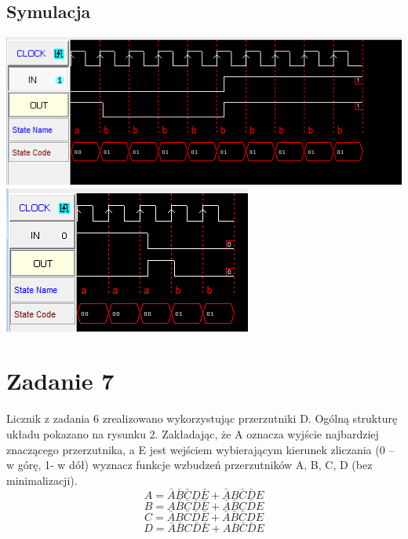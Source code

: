 \documentclass[a4paper, 11pt]{article}
\begin{document}
\subsection{Symulacja}\label{sub:symulacja} %
\begin{center}
	\includegraphics[scale=0.7]{images/4_sym_0.png}
	\includegraphics[scale=0.8]{images/4_sym_1.png}
\end{center}


\section{Zadanie 7}\label{sec:zadanie_} %
Licznik z zadania 6 zrealizowano wykorzystując przerzutniki D. Ogólną strukturę układu pokazano na rysunku 2.
Zakładając, że A oznacza wyjście najbardziej znaczącego przerzutnika, a E jest wejściem
wybierającym kierunek zliczania (0 – w górę, 1- w dół) wyznacz funkcje wzbudzeń przerzutników
A, B, C, D (bez minimalizacji).
\[
	A = \bar{A}\bar{B}\bar{C}D\bar{E} + \bar{A}B\bar{C}\bar{D}E
\]
\[
	B = A\bar{B}\bar{C}\bar{D}\bar{E} + \bar{A}\bar{B}C\bar{D}E
\]
\[
	C = \bar{A}B\bar{C}\bar{D}\bar{E} + \bar{A}\bar{B}\bar{C}DE
\]
\[
    D = \bar{A}\bar{B}C\bar{D}\bar{E} + A\bar{B}\bar{C}\bar{D}E
\]
\end{document}
